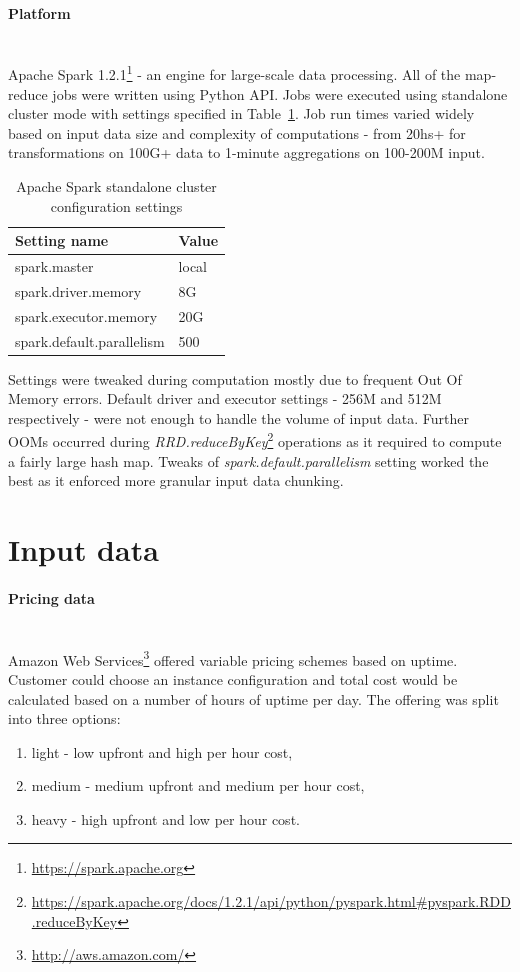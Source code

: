 \documentclass[]{final_report}
\newcommand{\myparagraph}[1]{\paragraph{#1}\mbox{}\\}
\begin{document}
\myparagraph{Platform}
Apache Spark 1.2.1\footnote{\url{https://spark.apache.org}} - an engine for large-scale data processing. All of the map-reduce jobs were written using Python API. Jobs were executed using standalone cluster mode with settings specified in Table~\ref{tab:spark_conf}. Job run times varied widely based on input data size and complexity of computations - from 20hs+ for transformations on 100G+ data to 1-minute aggregations on 100-200M input.

\begin{table}[h]
\begin{center}
    \begin{tabular}{| l | l |}
    \hline
    \textbf{Setting name} & \textbf{Value} \\
    \hline
    spark.master & local \\
    \hline
    spark.driver.memory & 8G \\
    \hline
    spark.executor.memory & 20G \\
    \hline
    spark.default.parallelism & 500 \\
    \hline
    \end{tabular}
\end{center}
\caption{Apache Spark standalone cluster configuration settings} 
\label{tab:spark_conf}
\end{table}

Settings were tweaked during computation mostly due to frequent Out Of Memory errors. Default driver and executor settings - 256M and 512M respectively - were not enough to handle the volume of input data. Further OOMs occurred during \textit{RRD.reduceByKey}\footnote{\url{https://spark.apache.org/docs/1.2.1/api/python/pyspark.html\#pyspark.RDD.reduceByKey}} operations as it required to compute a fairly large hash map. Tweaks of \textit{spark.default.parallelism} setting worked the best as it enforced more granular input data chunking.

\section{Input data}

\myparagraph{Pricing data}

Amazon Web Services\footnote{\url{http://aws.amazon.com/}} offered variable pricing schemes based on uptime. Customer could choose an instance configuration and total cost would be calculated based on a number of hours of uptime per day.
The offering was split into three options:
\begin{enumerate}
\item light - low upfront and high per hour cost,
\item medium - medium upfront and medium per hour cost,
\item heavy - high upfront and low per hour cost.
\end{enumerate}
\end{document}
